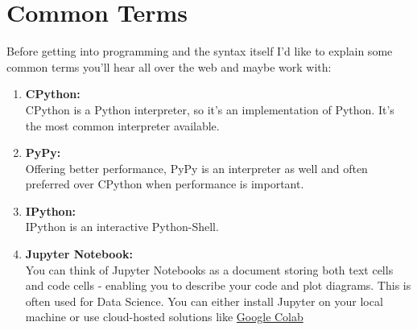 \section{Common Terms}
    Before getting into programming and the syntax itself I'd like to explain some common terms you'll hear all over the web and maybe work with:
    \begin{enumerate}
        \item \textbf{CPython:}\\
            CPython is a Python interpreter, so it's an implementation of Python.
            It's the most common interpreter available.
        \item \textbf{PyPy:}\\
            Offering better performance, PyPy is an interpreter as well and often preferred over CPython when performance is important.
        \item \textbf{IPython:}\\
            IPython is an interactive Python-Shell.
        \item \textbf{Jupyter Notebook:}\\
            You can think of Jupyter Notebooks as a document storing both text cells and code cells - enabling you to describe your code and plot diagrams. This is often used for Data Science.
            You can either install Jupyter on your local machine or use cloud-hosted solutions like \href{https://colab.research.google.com/}{Google Colab}
    \end{enumerate}